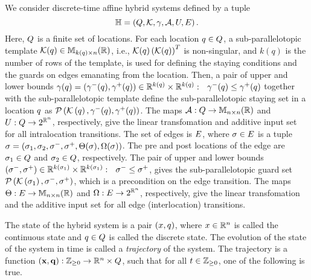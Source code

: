 

We consider discrete-time affine hybrid systems defined by a tuple 
%
\[
\mathbb{H} =
\left(Q,\mathcal{K},\gamma,\mathcal{A},U,E\right).
\]
%
Here, $Q$ is a finite set of locations.  For each location
$q\in Q$, a sub-parallelotopic template
$\mathcal{K}(q)\in\mathbb{M}_{k(q)\times n}(\mathbb{\mathbb{R}})$, i.e.,
$\mathcal{K}(q)\left(\mathcal{K}(q)\right)^T$ is non-singular, and
$k(q)$ is the number of rows of the template, is used for defining the
staying conditions and the guards on edges emanating from the
location.  Then, a pair of upper and lower bounds
$\gamma(q)=\left(\gamma^-(q),\gamma^+(q)\right)\in\mathbb{R}^{k(q)}\times\mathbb{R}^{k(q)}:
~~\gamma^-(q)\leq\gamma^+(q)$ together with the sub-parallelotopic
template define the sub-parallelotopic staying set in a location
$q$ as
$\mathcal{P}\left(\mathcal{K}\left(q\right),\gamma^-(q),\gamma^+(q)\right)$.  The
maps $\mathcal{A}:Q\rightarrow\mathbb{M}_{n\times n}(\mathbb{R})$ and
$U:Q\rightarrow 2^{\mathbb{R}^n}$, respectively, give the
linear transfomation and additive input set for all intralocation
transitions.  The set of edges is $E$, where $\sigma\in E$
is a tuple $\sigma =
\left(\sigma_{1},\sigma_{2},\sigma^-,\sigma^+,\Theta(\sigma),\Omega(\sigma)\right)$.  The pre and post locations of the edge are
$\sigma_{1}\in Q$ and $\sigma_{2}\in Q$,
respectively.  The pair of upper and lower bounds
$\left(\sigma^-,\sigma^+\right)\in\mathbb{R}^{k\left(\sigma_{1}\right)}\times\mathbb{R}^{k\left(\sigma_{1}\right)}:~~\sigma^-\leq\sigma^+$,
gives the sub-parallelotopic guard set
$\mathcal{P}\left(\mathcal{K}\left(\sigma_{1}\right),\sigma^-,\sigma^+\right)$, which
is a precondition on the edge transition.  The maps
$\Theta:E\rightarrow\mathbb{M}_{n\times n}(\mathbb{R})$ and $\Omega:E\rightarrow
2^{\mathbb{R}^n}$, respectively, give the linear transfomation and the
additive input set for all edge (interlocation) transitions.

The state of the hybrid system is a pair $(x,q)$, where
$x\in\mathbb{R}^n$ is called the continuous state and
$q\in Q$ is called the discrete state.  The
evolution of the state of the system in time is called a
\emph{trajectory} of the system.  The trajectory is a function
$\left({\bf x},{\bf q}\right):\mathbb{Z}_{\geq 0}\rightarrow\mathbb{R}^n\times Q$, such
that for all $t\in\mathbb{Z}_{\geq 0}$, one of the following is true.

